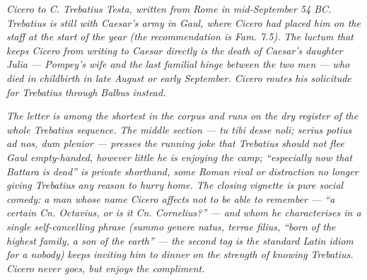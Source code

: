 
\textit{Cicero to C. Trebatius Testa, written from Rome in
mid-September 54 BC. Trebatius is still with Caesar's army in
Gaul, where Cicero had placed him on the staff at the start of
the year (the recommendation is \textit{Fam.} 7.5). The
\textit{luctum} that keeps Cicero from writing to Caesar directly
is the death of Caesar's daughter Julia --- Pompey's wife and the
last familial hinge between the two men --- who died in
childbirth in late August or early September. Cicero routes his
solicitude for Trebatius through Balbus instead.}

\textit{The letter is among the shortest in the corpus and runs
on the dry register of the whole Trebatius sequence. The middle
section --- \textit{tu tibi desse noli; serius potius ad nos, dum
plenior} --- presses the running joke that Trebatius should not
flee Gaul empty-handed, however little he is enjoying the camp;
``especially now that Battara is dead'' is private shorthand,
some Roman rival or distraction no longer giving Trebatius any
reason to hurry home. The closing vignette is pure social
comedy: a man whose name Cicero affects not to be able to
remember --- ``a certain Cn. Octavius, or is it Cn. Cornelius?'' ---
and whom he characterises in a single self-cancelling phrase
(\textit{summo genere natus, terrae filius}, ``born of the highest
family, a son of the earth'' --- the second tag is the standard
Latin idiom for a nobody) keeps inviting him to dinner on the
strength of knowing Trebatius. Cicero never goes, but enjoys
the compliment.}
